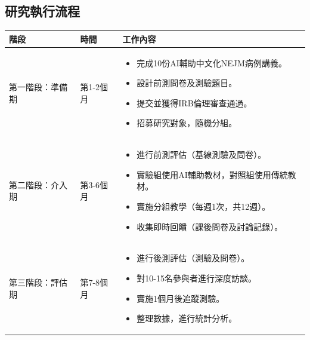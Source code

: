 \documentclass[12pt]{article}
\begin{document}
\subsection{研究執行流程}
\begin{longtable}{p{3cm} p{4cm} p{8cm}}
    \toprule
    \textbf{階段} & \textbf{時間} & \textbf{工作內容} \\
    \midrule
    第一階段：準備期 & 第1-2個月 & 
    \begin{itemize}[noitemsep]
        \item 完成10份AI輔助中文化NEJM病例講義。
        \item 設計前測問卷及測驗題目。
        \item 提交並獲得IRB倫理審查通過。
        \item 招募研究對象，隨機分組。
    \end{itemize} \\
    第二階段：介入期 & 第3-6個月 & 
    \begin{itemize}[noitemsep]
        \item 進行前測評估（基線測驗及問卷）。
        \item 實驗組使用AI輔助教材，對照組使用傳統教材。
        \item 實施分組教學（每週1次，共12週）。
        \item 收集即時回饋（課後問卷及討論記錄）。
    \end{itemize} \\
    第三階段：評估期 & 第7-8個月 & 
    \begin{itemize}[noitemsep]
        \item 進行後測評估（測驗及問卷）。
        \item 對10-15名參與者進行深度訪談。
        \item 實施1個月後追蹤測驗。
        \item 整理數據，進行統計分析。
    \end{itemize} \\
    \bottomrule
\end{longtable}
\end{document}
